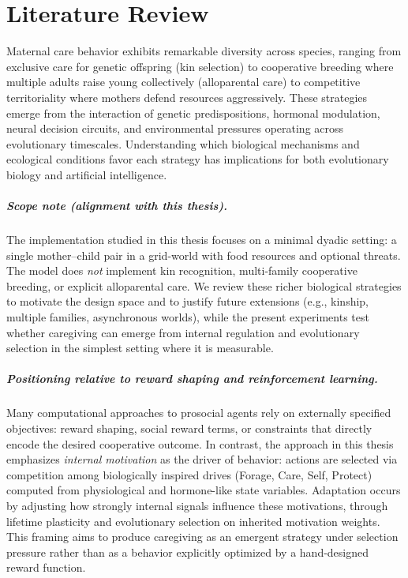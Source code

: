 \newpage

\chapter{Literature Review}
\noindent
Maternal care behavior exhibits remarkable diversity across species, ranging from exclusive care for genetic offspring (kin selection) to cooperative breeding where multiple adults raise young collectively (alloparental care) to competitive territoriality where mothers defend resources aggressively. These strategies emerge from the interaction of genetic predispositions, hormonal modulation, neural decision circuits, and environmental pressures operating across evolutionary timescales. Understanding which biological mechanisms and ecological conditions favor each strategy has implications for both evolutionary biology and artificial intelligence.

\paragraph{Scope note (alignment with this thesis).}
The implementation studied in this thesis focuses on a minimal dyadic setting: a single mother--child pair in a grid-world with food resources and optional threats. The model does \emph{not} implement kin recognition, multi-family cooperative breeding, or explicit alloparental care. We review these richer biological strategies to motivate the design space and to justify future extensions (e.g., kinship, multiple families, asynchronous worlds), while the present experiments test whether caregiving can emerge from internal regulation and evolutionary selection in the simplest setting where it is measurable.

\paragraph{Positioning relative to reward shaping and reinforcement learning.}
Many computational approaches to prosocial agents rely on externally specified objectives: reward shaping, social reward terms, or constraints that directly encode the desired cooperative outcome. In contrast, the approach in this thesis emphasizes \emph{internal motivation} as the driver of behavior: actions are selected via competition among biologically inspired drives (Forage, Care, Self, Protect) computed from physiological and hormone-like state variables. Adaptation occurs by adjusting how strongly internal signals influence these motivations, through lifetime plasticity and evolutionary selection on inherited motivation weights. This framing aims to produce caregiving as an emergent strategy under selection pressure rather than as a behavior explicitly optimized by a hand-designed reward function.

